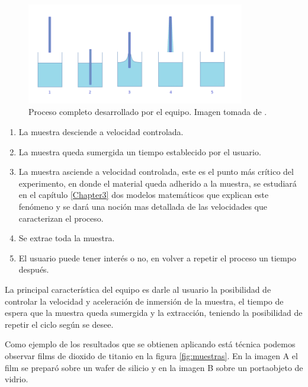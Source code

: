 \begin{figure}[htpb]
\centering 
\includegraphics[width=0.85\textwidth]{./Figures/dip-coating.png}
\caption{Proceso completo desarrollado por el equipo. Imagen tomada de \protect\footnotemark.}
\label{fig:inmersion}
\end{figure}

\begin{enumerate}
\item La muestra desciende a velocidad controlada.
\item La muestra queda sumergida un tiempo establecido por el usuario.	
\item La muestra asciende a velocidad controlada, este es el punto más crítico del experimento, en donde el material queda adherido a la muestra, se estudiará en el capítulo \ref{Chapter3} dos modelos matemáticos que explican este fenómeno y se dará una noción mas detallada de las velocidades que caracterizan el proceso.
\item Se extrae toda la muestra.
\item El usuario puede tener interés o no, en volver a repetir el proceso un tiempo después.
\end{enumerate} 
 
La principal característica del equipo es darle al usuario la posibilidad de controlar la velocidad y aceleración de inmersión de la muestra, el tiempo de espera que la muestra queda sumergida y la extracción, teniendo la posibilidad de repetir el ciclo según se desee.

Como ejemplo de los resultados que se obtienen aplicando está técnica podemos observar films de dioxido de titanio  en la figura \ref{fig:muestras}. En la imagen A el film se preparó sobre un wafer de silicio y en la imagen B sobre un portaobjeto de vidrio.



